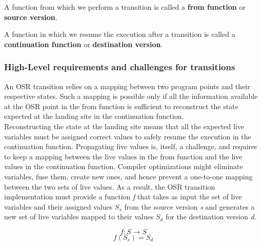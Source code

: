 \begin{definition}\label{from}
A function from which we perform a transition is called a \textbf{from function} or \textbf{source version}.
\end{definition}

\begin{definition}\label{continuation}
A function in which we resume the execution after a transition is called a \textbf{continuation function} or \textbf{destination version}.
\end{definition}

\subsubsection{High-Level requirements and challenges for transitions}\label{HLREQ}

An OSR transition relies on a mapping between two program points and their respective states.
Such a mapping is possible only if all the information available at the OSR point in the from function is sufficient to reconstruct the state expected at the landing site in the continuation function.\\

Reconstructing the state at the landing site means that all the expected live variables must be assigned  correct values to safely resume the execution in the continuation function.
Propagating live values is, itself, a challenge, and requires to keep a mapping between the live values in the from function and the live values in the continuation function.
Compiler optimizations might eliminate variables, fuse them, create new ones, and hence prevent a one-to-one mapping between the two sets of live values. 
As a result, the OSR transition implementation must provide a function \textit{f} that takes as input the set of live variables and their assigned values $S_s$ from the source version \textit{s} and generates a new set of live variables mapped to their values $S_d$ for the destination version \textit{d}.

\[f: S \rightarrow S\]
\[f(S_s) = S_d\]

